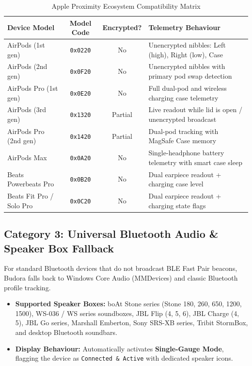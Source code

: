 \documentclass[11pt,a4paper]{article}
\begin{document}
\begin{table}[h!]
\centering
\small
\begin{tabularx}{\linewidth}{l c c p{6.5cm}}
\toprule
\textbf{Device Model} & \textbf{Model Code} & \textbf{Encrypted?} & \textbf{Telemetry Behaviour} \\
\midrule
AirPods (1st gen) & \texttt{0x0220} & No & Unencrypted nibbles: Left (high), Right (low), Case \\
AirPods (2nd gen) & \texttt{0x0F20} & No & Unencrypted nibbles with primary pod swap detection \\
AirPods Pro (1st gen) & \texttt{0x0E20} & No & Full dual-pod and wireless charging case telemetry \\
AirPods (3rd gen) & \texttt{0x1320} & Partial & Live readout while lid is open / unencrypted broadcast \\
AirPods Pro (2nd gen) & \texttt{0x1420} & Partial & Dual-pod tracking with MagSafe Case memory \\
AirPods Max & \texttt{0x0A20} & No & Single-headphone battery telemetry with smart case sleep \\
Beats Powerbeats Pro & \texttt{0x0B20} & No & Dual earpiece readout + charging case level \\
Beats Fit Pro / Solo Pro & \texttt{0x0C20} & No & Dual earpiece readout + charging state flags \\
\bottomrule
\end{tabularx}
\caption{Apple Proximity Ecosystem Compatibility Matrix}
\end{table}

\subsection{Category 3: Universal Bluetooth Audio \& Speaker Box Fallback}
For standard Bluetooth devices that do not broadcast BLE Fast Pair beacons, Budora falls back to Windows Core Audio (MMDevices) and classic Bluetooth profile tracking.

\begin{itemize}
    \item \textbf{Supported Speaker Boxes:} boAt Stone series (Stone 180, 260, 650, 1200, 1500), WS-036 / WS series soundboxes, JBL Flip (4, 5, 6), JBL Charge (4, 5), JBL Go series, Marshall Emberton, Sony SRS-XB series, Tribit StormBox, and desktop Bluetooth soundbars.
    \item \textbf{Display Behaviour:} Automatically activates \textbf{Single-Gauge Mode}, flagging the device as \texttt{Connected \& Active} with dedicated speaker icons.
\end{itemize}
\end{document}
